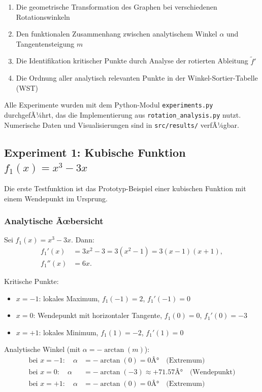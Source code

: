﻿\documentclass[12pt, a4paper]{article}
\theoremstyle{definition}
\begin{document}
	\begin{enumerate}[label=\roman*.]
		\item Die geometrische Transformation des Graphen bei verschiedenen Rotationswinkeln
		\item Den funktionalen Zusammenhang zwischen analytischem Winkel $\alpha$ und Tangentensteigung $m$
		\item Die Identifikation kritischer Punkte durch Analyse der rotierten Ableitung $\tilde{f}'$
		\item Die Ordnung aller analytisch relevanten Punkte in der Winkel-Sortier-Tabelle (WST)
	\end{enumerate}
	
	Alle Experimente wurden mit dem Python-Modul \texttt{experiments.py} durchgefÃ¼hrt,
	das die Implementierung aus \texttt{rotation\_analysis.py} nutzt. Numerische Daten
	und Visualisierungen sind in \texttt{src/results/} verfÃ¼gbar.
	
	\subsection{Experiment 1: Kubische Funktion $f_1(x) = x^3 - 3x$}
	\label{subsec:exp1}
	
	Die erste Testfunktion ist das Prototyp-Beispiel einer kubischen Funktion mit
	einem Wendepunkt im Ursprung.
	
	\subsubsection{Analytische Ãœbersicht}
	
	Sei $f_1(x) = x^3 - 3x$. Dann:
	\begin{align}
		f_1'(x) &= 3x^2 - 3 = 3(x^2 - 1) = 3(x-1)(x+1), \\
		f_1''(x) &= 6x.
	\end{align}
	
	Kritische Punkte:
	\begin{itemize}
		\item $x = -1$: lokales Maximum, $f_1(-1) = 2$, $f_1'(-1) = 0$
		\item $x = 0$: Wendepunkt mit horizontaler Tangente, $f_1(0) = 0$, $f_1'(0) = -3$
		\item $x = +1$: lokales Minimum, $f_1(1) = -2$, $f_1'(1) = 0$
	\end{itemize}
	
	Analytische Winkel (mit $\alpha = -\arctan(m)$):
	\begin{align*}
		\text{bei } x=-1: \quad \alpha &= -\arctan(0) = 0Â° \quad \text{(Extremum)} \\
		\text{bei } x=0: \quad \alpha &= -\arctan(-3) \approx +71.57Â° \quad \text{(Wendepunkt)} \\
		\text{bei } x=+1: \quad \alpha &= -\arctan(0) = 0Â° \quad \text{(Extremum)}
	\end{align*}
	
\end{document}
